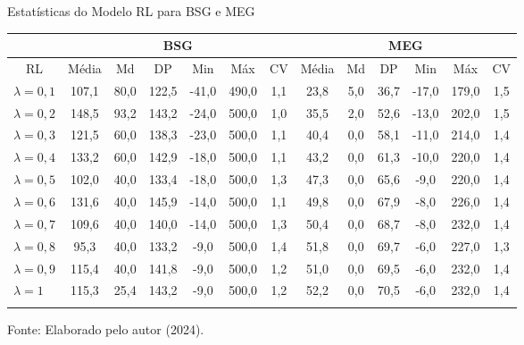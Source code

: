 \begin{tabela}[H]
	\small
	\centering
	\caption{Estatísticas do Modelo RL para BSG e MEG}
	\begin{tabular}{l|c c c c c c|c c c c c c}
		\Xhline{2\arrayrulewidth}
		& \multicolumn{6}{c|}{BSG} & \multicolumn{6}{c}{MEG} \\ \hline
		\multicolumn{1}{c|}{RL} & Média & Md & DP & Min & Máx & CV & Média & Md & DP & Min & Máx & CV \\ \hline
		$\lambda = 0,1$ & 107,1 & 80,0 & 122,5 & -41,0 & 490,0 & 1,1 & 23,8 & 5,0 & 36,7 & -17,0 & 179,0 & 1,5 \\
		$\lambda = 0,2$ & 148,5 & 93,2 & 143,2 & -24,0 & 500,0 & 1,0 & 35,5 & 2,0 & 52,6 & -13,0 & 202,0 & 1,5 \\
		$\lambda = 0,3$ & 121,5 & 60,0 & 138,3 & -23,0 & 500,0 & 1,1 & 40,4 & 0,0 & 58,1 & -11,0 & 214,0 & 1,4 \\
		$\lambda = 0,4$ & 133,2 & 60,0 & 142,9 & -18,0 & 500,0 & 1,1 & 43,2 & 0,0 & 61,3 & -10,0 & 220,0 & 1,4 \\
		$\lambda = 0,5$ & 102,0 & 40,0 & 133,4 & -18,0 & 500,0 & 1,3 & 47,3 & 0,0 & 65,6 & -9,0 & 220,0 & 1,4 \\
		$\lambda = 0,6$ & 131,6 & 40,0 & 145,9 & -14,0 & 500,0 & 1,1 & 49,8 & 0,0 & 67,9 & -8,0 & 226,0 & 1,4 \\
		$\lambda = 0,7$ & 109,6 & 40,0 & 140,0 & -14,0 & 500,0 & 1,3 & 50,4 & 0,0 & 68,7 & -8,0 & 232,0 & 1,4 \\
		$\lambda = 0,8$ & 95,3 & 40,0 & 133,2 & -9,0 & 500,0 & 1,4 & 51,8 & 0,0 & 69,7 & -6,0 & 227,0 & 1,3 \\
		$\lambda = 0,9$ & 115,4 & 40,0 & 141,8 & -9,0 & 500,0 & 1,2 & 51,0 & 0,0 & 69,5 & -6,0 & 232,0 & 1,4 \\
		$\lambda = 1$ & 115,3 & 25,4 & 143,2 & -9,0 & 500,0 & 1,2 & 52,2 & 0,0 & 70,5 & -6,0 & 232,0 & 1,4 \\
		\Xhline{2\arrayrulewidth}
	\end{tabular}
	\label{tabela_4}
	\caption*{\fontsize{10}{12}\selectfont Fonte: Elaborado pelo autor (2024).}
\end{tabela}
